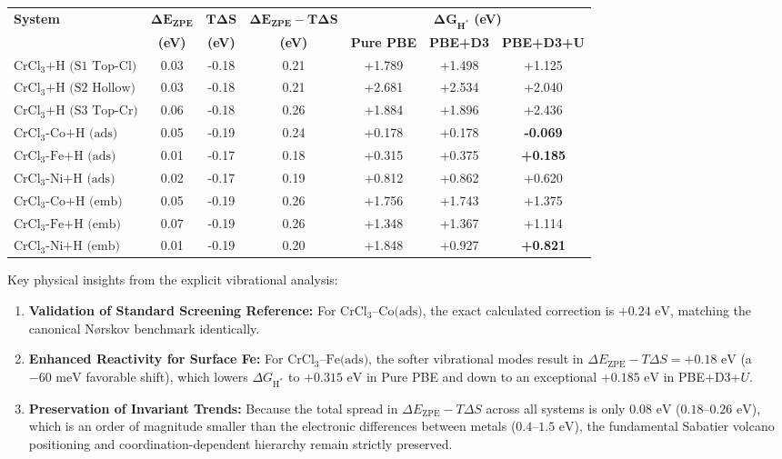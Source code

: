 \documentclass[11pt, sans, a4paper]{moderncv}
\begin{document}
\begin{center}
  \small
  \begin{tabular}{l c c c c c c}
    \toprule
    \textbf{System} & $\boldsymbol{\Delta E_{\text{ZPE}}}$ & $\boldsymbol{T \Delta S}$ & $\boldsymbol{\Delta E_{\text{ZPE}} - T\Delta S}$ & \multicolumn{3}{c}{$\boldsymbol{\Delta G_{\text{H}^*}}$ \textbf{(eV)}} \\
    \cmidrule(lr){5-7}
    & \textbf{(eV)} & \textbf{(eV)} & \textbf{(eV)} & \textbf{Pure PBE} & \textbf{PBE+D3} & \textbf{PBE+D3+U} \\
    \midrule
    $\text{CrCl}_3\text{+H (S1 Top-Cl)}$ & 0.03 & -0.18 & 0.21 & +1.789 & +1.498 & +1.125 \\
    $\text{CrCl}_3\text{+H (S2 Hollow)}$ & 0.03 & -0.18 & 0.21 & +2.681 & +2.534 & +2.040 \\
    $\text{CrCl}_3\text{+H (S3 Top-Cr)}$ & 0.06 & -0.18 & 0.26 & +1.884 & +1.896 & +2.436 \\
    $\text{CrCl}_3\text{-Co+H (ads)}$     & 0.05 & -0.19 & 0.24 & +0.178 & +0.178 & \textbf{-0.069} \\
    $\text{CrCl}_3\text{-Fe+H (ads)}$     & 0.01 & -0.17 & 0.18 & +0.315 & +0.375 & \textbf{+0.185} \\
    $\text{CrCl}_3\text{-Ni+H (ads)}$     & 0.02 & -0.17 & 0.19 & +0.812 & +0.862 & +0.620 \\
    $\text{CrCl}_3\text{-Co+H (emb)}$     & 0.05 & -0.19 & 0.26 & +1.756 & +1.743 & +1.375 \\
    $\text{CrCl}_3\text{-Fe+H (emb)}$     & 0.07 & -0.19 & 0.26 & +1.348 & +1.367 & +1.114 \\
    $\text{CrCl}_3\text{-Ni+H (emb)}$     & 0.01 & -0.19 & 0.20 & +1.848 & +0.927 & \textbf{+0.821} \\
    \bottomrule
  \end{tabular}
\end{center}

\noindent Key physical insights from the explicit vibrational analysis:
\begin{enumerate}[leftmargin=1.5em, itemsep=0.2em]
  \item \textbf{Validation of Standard Screening Reference:} For $\text{CrCl}_3\text{--Co(ads)}$, the exact calculated correction is $+0.24\text{ eV}$, matching the canonical N{\o}rskov benchmark identically.
  \item \textbf{Enhanced Reactivity for Surface Fe:} For $\text{CrCl}_3\text{--Fe(ads)}$, the softer vibrational modes result in $\Delta E_{\text{ZPE}} - T\Delta S = +0.18\text{ eV}$ (a $-60\text{ meV}$ favorable shift), which lowers $\Delta G_{\mathrm{H}^*}$ to $+0.315\text{ eV}$ in Pure PBE and down to an exceptional $+0.185\text{ eV}$ in PBE+D3+$U$.
  \item \textbf{Preservation of Invariant Trends:} Because the total spread in $\Delta E_{\text{ZPE}} - T\Delta S$ across all systems is only $0.08\text{ eV}$ ($0.18\text{--}0.26\text{ eV}$), which is an order of magnitude smaller than the electronic differences between metals ($0.4\text{--}1.5\text{ eV}$), the fundamental Sabatier volcano positioning and coordination-dependent hierarchy remain strictly preserved.
\end{enumerate}
\end{document}
